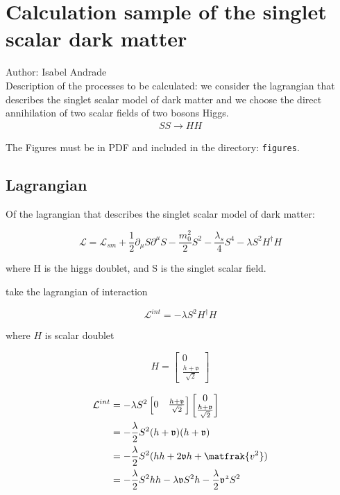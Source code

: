 \chapter{Calculation sample of the singlet scalar dark matter}

Author: Isabel Andrade\\

Description of the processes to be calculated: we consider the lagrangian that describes the singlet scalar model of dark matter and we choose the direct annihilation of two scalar fields of two bosons Higgs.\\

\begin{align}
SS \to HH
\end{align}

The Figures must be in PDF and included in the directory: \verb|figures|.

\section{Lagrangian}

Of the lagrangian that describes the singlet scalar model of dark matter:

\begin{equation}
\mathcal{L}=\mathcal{L}_{sm} + \frac{1}{2} \partial_\mu S\partial^\mu S -\frac{m_0 ^2}{2} S^2 - \frac{\lambda_s}{4} S^4 - \lambda S^2H^\dagger H
\end{equation}

where H is the higgs doublet, and S is the singlet scalar field.

take the lagrangian of interaction

\begin{equation}
\mathcal{L}^{int} = - \lambda S^2 H^\dagger H
\end{equation}

where $H$ is scalar doublet

\begin{equation}
H=\begin{bmatrix}{0}\\{\frac{h+\mathfrak{v}}{\sqrt{2}}}\end{bmatrix}
\end{equation}

\begin{equation}
\begin{split}
\mathcal{L}^{int} & ={ - \lambda S^2 \begin{bmatrix}{0}&{\frac{h+\mathfrak{v}}{\sqrt{2}}}\end{bmatrix} \begin{bmatrix}{0}\\{\frac{h+\mathfrak{v}}{\sqrt{2}}}\end{bmatrix}}\\  
& =  {- \frac{\lambda}{2} S^2 (h+\mathfrak{v})(h+\mathfrak{v})}\\
& = {-\frac{\lambda}{2} S^2 (hh+2 \mathfrak{v} h + \matfrak{v^2})}\\
& = {-\frac{\lambda}{2} S^2hh - \lambda \mathfrak{v} S^2 h -\frac{\lambda}{2} \mathfrak{v^2} S^2}
\end{split}
\end{equation}

